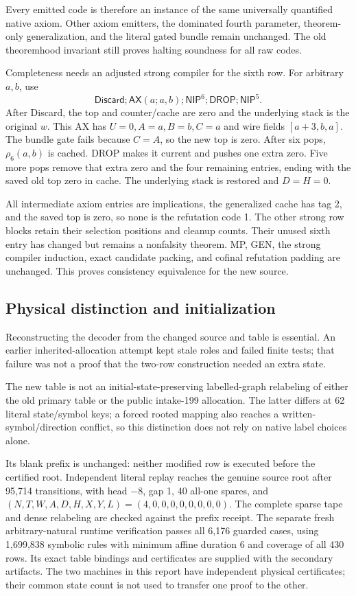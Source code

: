 Every emitted code is therefore an instance of the same universally quantified native axiom. Other axiom emitters, the dominated fourth parameter, theorem-only generalization, and the literal gated bundle remain unchanged. The old theoremhood invariant still proves halting soundness for all raw codes.

Completeness needs an adjusted strong compiler for the sixth row. For arbitrary $a,b$, use
\[
 \mathsf{Discard};\mathsf{AX}(a;a,b);
 \mathsf{NIP}^{6};\mathsf{DROP};\mathsf{NIP}^{5}.
\]
After Discard, the top and counter/cache are zero and the underlying stack is the original $w$. This AX has $U=0,A=a,B=b,C=a$ and wire fields $[a+3,b,a]$. The bundle gate fails because $C=A$, so the new top is zero. After six pops, $\rho_6(a,b)$ is cached. DROP makes it current and pushes one extra zero. Five more pops remove that extra zero and the four remaining entries, ending with the saved old top zero in cache. The underlying stack is restored and $D=H=0$.

All intermediate axiom entries are implications, the generalized cache has tag 2, and the saved top is zero, so none is the refutation code 1. The other strong row blocks retain their selection positions and cleanup counts. Their unused sixth entry has changed but remains a nonfalsity theorem. MP, GEN, the strong compiler induction, exact candidate packing, and cofinal refutation padding are unchanged. This proves consistency equivalence for the new source.

\subsection{Physical distinction and initialization}
Reconstructing the decoder from the changed source and table is essential. An earlier inherited-allocation attempt kept stale roles and failed finite tests; that failure was not a proof that the two-row construction needed an extra state.

The new table is not an initial-state-preserving labelled-graph relabeling of either the old primary table or the public intake-199 allocation. The latter differs at 62 literal state/symbol keys; a forced rooted mapping also reaches a written-symbol/direction conflict, so this distinction does not rely on native label choices alone.

Its blank prefix is unchanged: neither modified row is executed before the certified root. Independent literal replay reaches the genuine source root after 95,714 transitions, with head $-8$, gap 1, 40 all-one spares, and $(N,T,W,A,D,H,X,Y,L)=(4,0,0,0,0,0,0,0,0)$. The complete sparse tape and dense relabeling are checked against the prefix receipt. The separate fresh arbitrary-natural runtime verification passes all 6,176 guarded cases, using 1,699,838 symbolic rules with minimum affine duration 6 and coverage of all 430 rows. Its exact table bindings and certificates are supplied with the secondary artifacts. The two machines in this report have independent physical certificates; their common state count is not used to transfer one proof to the other.
